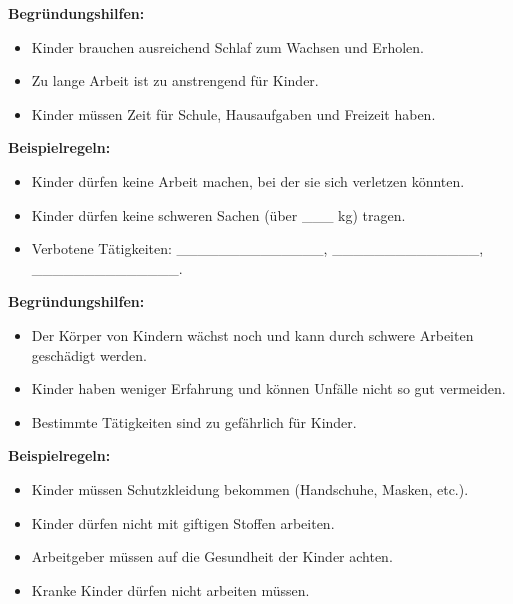 \documentclass[12pt, a4paper]{article}
\newenvironment{cardbox}[1]{%
    \begin{framed}
        \noindent\colorbox{boxcolor}{\makebox[\dimexpr\linewidth-2\fboxsep\relax][c]{\textbf{\textcolor{white}{#1}}}}
        \par\vspace{0.5em}
    }{%
    \end{framed}
}
\newenvironment{hintbox}{%
    \begin{framed}
        \setlength{\fboxsep}{10pt}
        \color{black}
        \itshape
    }{%
    \end{framed}
}
\begin{document}
\begin{multicols}{2}
\begin{cardbox}{BEREICH: ZEIT}
            \textbf{Begründungshilfen:}
            \begin{hintbox}
            \begin{itemize}[leftmargin=*]
                \item Kinder brauchen ausreichend Schlaf zum Wachsen und Erholen.
                \item Zu lange Arbeit ist zu anstrengend für Kinder.
                \item Kinder müssen Zeit für Schule, Hausaufgaben und Freizeit haben.
            \end{itemize}
            \end{hintbox}
        \end{cardbox}

        \begin{cardbox}{BEREICH: TÄTIGKEITEN}
            \textbf{Beispielregeln:}
            \begin{itemize}[leftmargin=*]
                \item Kinder dürfen keine Arbeit machen, bei der sie sich verletzen könnten.
                \item Kinder dürfen keine schweren Sachen (über \_\_\_ kg) tragen.
                \item Verbotene Tätigkeiten: \_\_\_\_\_\_\_\_\_\_\_\_\_\_, \_\_\_\_\_\_\_\_\_\_\_\_\_\_, \_\_\_\_\_\_\_\_\_\_\_\_\_\_.
            \end{itemize}
            
            \textbf{Begründungshilfen:}
            \begin{hintbox}
            \begin{itemize}[leftmargin=*]
                \item Der Körper von Kindern wächst noch und kann durch schwere Arbeiten geschädigt werden.
                \item Kinder haben weniger Erfahrung und können Unfälle nicht so gut vermeiden.
                \item Bestimmte Tätigkeiten sind zu gefährlich für Kinder.
            \end{itemize}
            \end{hintbox}
        \end{cardbox}

        \begin{cardbox}{BEREICH: GESUNDHEIT}
            \textbf{Beispielregeln:}
            \begin{itemize}[leftmargin=*]
                \item Kinder müssen Schutzkleidung bekommen (Handschuhe, Masken, etc.).
                \item Kinder dürfen nicht mit giftigen Stoffen arbeiten.
                \item Arbeitgeber müssen auf die Gesundheit der Kinder achten.
                \item Kranke Kinder dürfen nicht arbeiten müssen.
            \end{itemize}
            

\end{cardbox}
\end{multicols}
\end{document}
